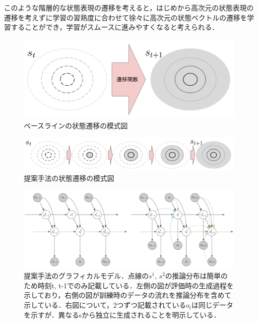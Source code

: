 \documentclass[10pt, twocolumn]{jarticle}
\begin{document}
このような階層的な状態表現の遷移を考えると，はじめから高次元の状態表現の遷移を考えずに学習の習熟度に合わせて徐々に高次元の状態ベクトルの遷移を学習することができ，学習がスムースに進みやすくなると考えられる．

\begin{figure}[tbp]
  \begin{center}
    \includegraphics[width=0.5\linewidth]{./figures/transition_base.png}
    \caption{ベースラインの状態遷移の模式図}
    \label{fig:transition_base}
  \end{center}
\end{figure}

\begin{figure}[tbp]
  \begin{center}
    \includegraphics[width=0.8\linewidth]{./figures/transition_proposal.png}
    \caption{提案手法の状態遷移の模式図}
    \label{fig:transition_proposal}
  \end{center}
\end{figure}

\begin{figure}[tbp]
  \begin{center}
    \includegraphics[width=\linewidth]{./figures/proposal.png}
    \caption[提案手法のグラフィカルモデル]{提案手法のグラフィカルモデル．点線の$s^1$, $s^2$の推論分布は簡単のため時刻t, t-1でのみ記載している．左側の図が評価時の生成過程を示しており，右側の図が訓練時のデータの流れを推論分布を含めて示している．右図について，2つずつ記載されている$o_t$は同じデータを示すが．異なるsから独立に生成されることを明示している．}
    \label{fig:proposal}
  \end{center}
\end{figure}
\end{document}
